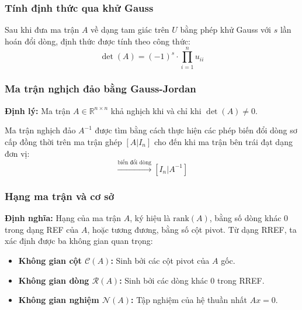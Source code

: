 \documentclass[a4paper]{article}
\begin{document}
\subsubsection{Tính định thức qua khử Gauss}
Sau khi đưa ma trận $A$ về dạng tam giác trên $U$ bằng phép khử Gauss với $s$ lần hoán đổi dòng, định thức được tính theo công thức:
\begin{equation}
    \det(A) = (-1)^s \cdot \prod_{i=1}^{n} u_{ii}
\end{equation}

\subsubsection{Ma trận nghịch đảo bằng Gauss-Jordan}
\textbf{Định lý:} Ma trận $A \in \mathbb{R}^{n \times n}$ khả nghịch khi và chỉ khi $\det(A) \neq 0$.

Ma trận nghịch đảo $A^{-1}$ được tìm bằng cách thực hiện các phép biến đổi dòng sơ cấp đồng thời trên ma trận ghép $[A | I_n]$ cho đến khi ma trận bên trái đạt dạng đơn vị:
\begin{equation}
    [A | I_n] \xrightarrow{\text{biến đổi dòng}} [I_n | A^{-1}]
\end{equation}

\subsubsection{Hạng ma trận và cơ sở}
\textbf{Định nghĩa:} Hạng của ma trận $A$, ký hiệu là $\text{rank}(A)$, bằng số dòng khác 0 trong dạng REF của $A$, hoặc tương đương, bằng số cột pivot. Từ dạng RREF, ta xác định được ba không gian quan trọng:
\begin{itemize}
    \item \textbf{Không gian cột $\mathcal{C}(A)$:} Sinh bởi các cột pivot của $A$ gốc.
    \item \textbf{Không gian dòng $\mathcal{R}(A)$:} Sinh bởi các dòng khác 0 trong RREF.
    \item \textbf{Không gian nghiệm $\mathcal{N}(A)$:} Tập nghiệm của hệ thuần nhất $Ax = 0$.
\end{itemize}
\end{document}
